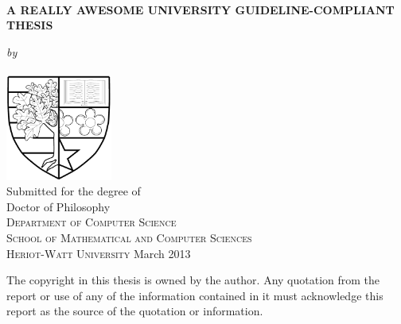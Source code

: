 \documentclass[a4paper,12pt]{report}
\newcommand{\auth}{Your Name}
\newcommand{\thesistitle}{A Really Awesome University Guideline-Compliant Thesis}
\newcommand{\degree}{Doctor of Philosophy}
\newcommand{\supdate}{March 2013}
\begin{document}
\doublespacing

\pagestyle{empty}
\begin{center}
\begin{spacing}{2}
{\large{\ \\  \vspace{1.5cm}\textbf{\MakeUppercase{\thesistitle}}}}\\
\end{spacing}
\vfill
{\Large\textit{by}}\\\vspace{0.2cm}
{\Large\upshape{\auth}}\\\vspace{1.0cm}
\includegraphics[width=3.5cm]{Figures/LogoBlack.jpg}\\
\vspace{1cm}
{\large Submitted for the degree of \\ \degree}\\
\vspace{1cm}
{\large\textsc{Department of Computer Science}\\
\textsc{School of Mathematical and Computer Sciences}\\
\textsc{Heriot-Watt University}}\vfill
{\large{\supdate}}
\end{center}
{\small The copyright in this thesis is owned by the author. Any quotation from the report or use of any of the information contained in it must acknowledge this report as the source of the quotation or information.}
\clearpage


\clearpage
\pagestyle{plain}
\clearpage{}

\tableofcontents
\listoftables
\listoffigures
\printglossaries
\clearpage
\pagestyle{fancy}
\fancyhead{}
\lhead{\slshape \leftmark} 
\cfoot{\thepage}
\renewcommand{\headrulewidth}{0.4pt}
\renewcommand{\footrulewidth}{0.0pt}
\renewcommand{\chaptermark}[1]{\markboth{\chaptername\ \thechapter:\ #1}{}}








\appendix
\renewcommand{\chaptermark}[1]{\markboth{Appendix \thechapter.\ #1}{}}




\end{document}
